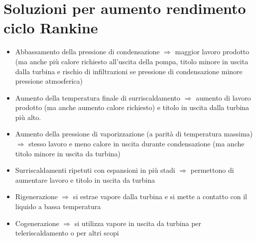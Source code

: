 \section{Soluzioni per aumento rendimento ciclo Rankine}

\begin{itemize}
    \item Abbassamento della pressione di condensazione $\Rightarrow$ maggior lavoro prodotto (ma anche più calore richiesto all'uscita della pompa, titolo minore in uscita dalla turbina e rischio di infiltrazioni se pressione di condensazione minore pressione atmosferica)
    \item Aumento della temperatura finale di surriscaldamento $\Rightarrow$ aumento di lavoro prodotto (ma anche aumento calore richiesto) e titolo in uscita dalla turbina più alto.
    \item Aumento della pressione di vaporizzazione (a parità di temperatura massima) $\Rightarrow$ stesso lavoro e meno calore in uscita durante condensazione (ma anche titolo minore in uscita da turbina)
    \item Surriscaldamenti ripetuti con espansioni in più stadi $\Rightarrow$ permettono di aumentare lavoro e titolo in uscita da turbina
    \item Rigenerazione $\Rightarrow$ si estrae vapore dalla turbina e si mette a contatto con il liquido a bassa temperatura
    \item Cogenerazione $\Rightarrow$ si utilizza vapore in uscita da turbina per teleriscaldamento o per altri scopi
\end{itemize}
